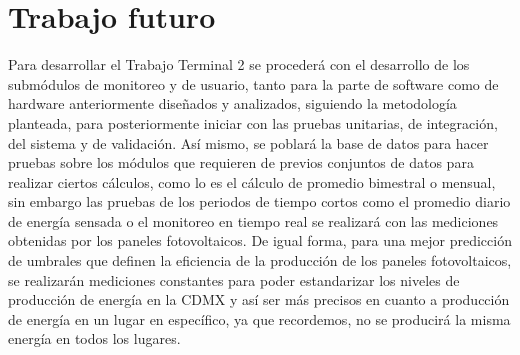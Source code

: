 \chapter{Trabajo futuro}\label{chapter6}
Para desarrollar el Trabajo Terminal 2 se procederá con el desarrollo de los submódulos de monitoreo y de usuario, tanto para la parte de software como de hardware anteriormente diseñados y analizados, siguiendo la metodología planteada, para posteriormente iniciar con las pruebas unitarias, de integración, del sistema y de validación. Así mismo, se poblará la base de datos para hacer pruebas sobre los módulos que requieren de previos conjuntos de datos para realizar ciertos cálculos, como lo es el cálculo de promedio bimestral o mensual, sin embargo las pruebas de los periodos de tiempo cortos como el promedio diario de energía sensada o el monitoreo en tiempo real se realizará con las mediciones obtenidas por los paneles fotovoltaicos. 
\newline De igual forma, para una mejor predicción de umbrales que definen la eficiencia de la producción de los paneles fotovoltaicos, se realizarán mediciones constantes para poder estandarizar los niveles de producción de energía en la CDMX y así ser más precisos en cuanto a producción de energía en un lugar en específico, ya que recordemos, no se producirá la misma energía en todos los lugares. 
\\
